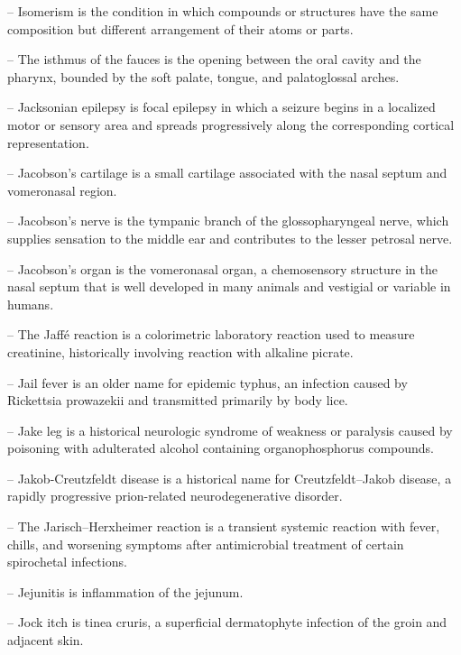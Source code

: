 -- Isomerism is the condition in which compounds or structures have the same composition but different arrangement of their atoms or parts.

-- The isthmus of the fauces is the opening between the oral cavity and the pharynx, bounded by the soft palate, tongue, and palatoglossal arches.

-- Jacksonian epilepsy is focal epilepsy in which a seizure begins in a localized motor or sensory area and spreads progressively along the corresponding cortical representation.

-- Jacobson's cartilage is a small cartilage associated with the nasal septum and vomeronasal region.

-- Jacobson's nerve is the tympanic branch of the glossopharyngeal nerve, which supplies sensation to the middle ear and contributes to the lesser petrosal nerve.

-- Jacobson's organ is the vomeronasal organ, a chemosensory structure in the nasal septum that is well developed in many animals and vestigial or variable in humans.

-- The Jaffé reaction is a colorimetric laboratory reaction used to measure creatinine, historically involving reaction with alkaline picrate.

-- Jail fever is an older name for epidemic typhus, an infection caused by Rickettsia prowazekii and transmitted primarily by body lice.

-- Jake leg is a historical neurologic syndrome of weakness or paralysis caused by poisoning with adulterated alcohol containing organophosphorus compounds.

-- Jakob-Creutzfeldt disease is a historical name for Creutzfeldt--Jakob disease, a rapidly progressive prion-related neurodegenerative disorder.

-- The Jarisch--Herxheimer reaction is a transient systemic reaction with fever, chills, and worsening symptoms after antimicrobial treatment of certain spirochetal infections.

-- Jejunitis is inflammation of the jejunum.

-- Jock itch is tinea cruris, a superficial dermatophyte infection of the groin and adjacent skin.

